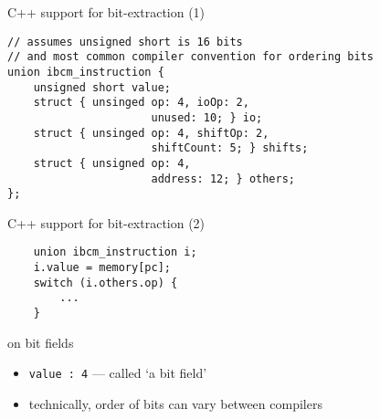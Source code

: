 \begin{frame}[fragile,label=cSupport1]{C++ support for bit-extraction (1)}
\begin{lstlisting}
// assumes unsigned short is 16 bits
// and most common compiler convention for ordering bits
union ibcm_instruction {
    unsigned short value;
    struct { unsinged op: 4, ioOp: 2,   
                      unused: 10; } io;
    struct { unsinged op: 4, shiftOp: 2,
                      shiftCount: 5; } shifts;
    struct { unsigned op: 4,
                      address: 12; } others;
};
\end{lstlisting}
\end{frame}

\begin{frame}[fragile,label=cSupport2]{C++ support for bit-extraction (2)}
\begin{lstlisting}
    union ibcm_instruction i;
    i.value = memory[pc];
    switch (i.others.op) {
        ...
    }
\end{lstlisting}
\end{frame}

\begin{frame}{on bit fields}
\begin{itemize}
\item \texttt{value : 4} --- called `a bit field'
\item technically, order of bits can vary between compilers
\end{itemize}
\end{frame}
